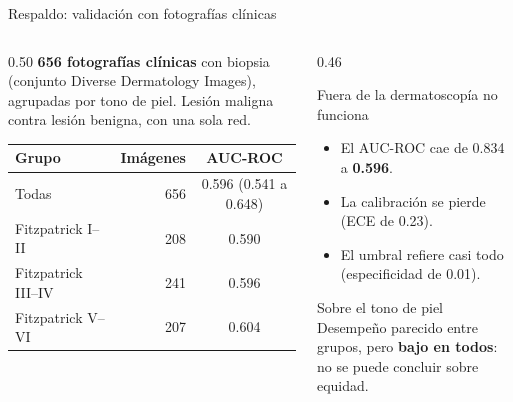 \documentclass[aspectratio=169,10pt]{beamer}
\begin{document}
\begin{frame}{Respaldo: validación con fotografías clínicas}
  \begin{columns}[c]
    \begin{column}{0.50\textwidth}
      \small
      \textbf{656 fotografías clínicas} con biopsia (conjunto Diverse Dermatology Images), agrupadas por tono de piel. Lesión maligna contra lesión benigna, con una sola red.
      \vspace{0.5em}
      \begin{center}
        \setlength{\tabcolsep}{4pt}
        \begin{tabular}{lrc}
          \toprule
          \textbf{Grupo} & \textbf{Imágenes} & \textbf{AUC-ROC} \\
          \midrule
          Todas & 656 & 0.596 (0.541 a 0.648) \\
          Fitzpatrick I--II & 208 & 0.590 \\
          Fitzpatrick III--IV & 241 & 0.596 \\
          Fitzpatrick V--VI & 207 & 0.604 \\
          \bottomrule
        \end{tabular}
      \end{center}
    \end{column}
    \begin{column}{0.46\textwidth}
      \begin{alertblock}{Fuera de la dermatoscopía no funciona}
        \begin{itemize}
          \item El AUC-ROC cae de 0.834 a \textbf{0.596}.
          \item La calibración se pierde (ECE de 0.23).
          \item El umbral refiere casi todo (especificidad de 0.01).
        \end{itemize}
      \end{alertblock}
      \begin{block}{Sobre el tono de piel}
        Desempeño parecido entre grupos, pero \textbf{bajo en todos}: no se puede concluir sobre equidad.
      \end{block}
    \end{column}
  \end{columns}
\end{frame}
\end{document}
